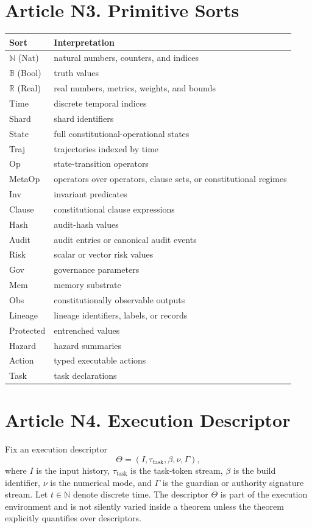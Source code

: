 \documentclass[10pt,oneside]{article}
\theoremstyle{definition}
\theoremstyle{remark}
\newcommand{\N}{\mathbb{N}}
\newcommand{\B}{\mathbb{B}}
\newcommand{\R}{\mathbb{R}}
\newcommand{\task}{\mathrm{task}}
\begin{document}
\section{Article N3. Primitive Sorts}
\begin{longtable}{p{}p{}}
\toprule
Sort & Interpretation \\
\midrule
\(\N\) (Nat) & natural numbers, counters, and indices \\
\(\B\) (Bool) & truth values \\
\(\R\) (Real) & real numbers, metrics, weights, and bounds \\
Time & discrete temporal indices \\
Shard & shard identifiers \\
State & full constitutional-operational states \\
Traj & trajectories indexed by time \\
Op & state-transition operators \\
MetaOp & operators over operators, clause sets, or constitutional regimes \\
Inv & invariant predicates \\
Clause & constitutional clause expressions \\
Hash & audit-hash values \\
Audit & audit entries or canonical audit events \\
Risk & scalar or vector risk values \\
Gov & governance parameters \\
Mem & memory substrate \\
Obs & constitutionally observable outputs \\
Lineage & lineage identifiers, labels, or records \\
Protected & entrenched values \\
Hazard & hazard summaries \\
Action & typed executable actions \\
Task & task declarations \\
\bottomrule
\end{longtable}

\section{Article N4. Execution Descriptor}
Fix an execution descriptor
\[
\Theta=(I,\tau_{\task},\beta,\nu,\Gamma),
\]
where \(I\) is the input history, \(\tau_{\task}\) is the task-token stream, \(\beta\) is the build identifier, \(\nu\) is the numerical mode, and \(\Gamma\) is the guardian or authority signature stream. Let \(t\in\N\) denote discrete time. The descriptor \(\Theta\) is part of the execution environment and is not silently varied inside a theorem unless the theorem explicitly quantifies over descriptors.
\end{document}
